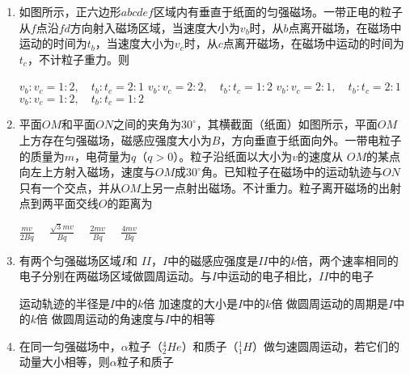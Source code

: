 \begin{enumerate}[leftmargin=0em]
\item
{}
如图所示，正六边形$ abcdef $区域内有垂直于纸面的匀强磁场。一带正电的粒子从$ f $点沿$ fd $方向射入磁场区域，当速度大小为$ v_b $时，从$ b $点离开磁场，在磁场中运动的时间为$ t_b $，当速度大小为$ v_c $时，从$ c $点离开磁场，在磁场中运动的时间为$ t_c $，不计粒子重力。则  
\begin{figure}[h!]
\centering

\end{figure}


\fourchoices
{$v _ { b }: v _ { c } = 1: 2 , \quad t _ { b }: t _ { c } = 2: 1$}
{$v _ { b }: v _ { c } = 2: 2 , \quad t _ { b }: t _ { c } = 1: 2$}
{$v _ { b }: v _ { c } = 2: 1 , \quad t _ { b }: t _ { c } = 2: 1$}
{$v _ { b }: v _ { c } = 1: 2 , \quad t _ { b }: t _ { c } = 1: 2$}

\item
{}
平面$ OM $和平面$ ON $之间的夹角为$ 30 ^{ \circ } $，其横截面（纸面）如图所示，平面$ OM $上方存在匀强磁场，磁感应强度大小为$ B $，方向垂直于纸面向外。一带电粒子的质量为$ m $，电荷量为$ q $（$ q>0 $）。粒子沿纸面以大小为$ v $的速度从	$ OM $的某点向左上方射入磁场，速度与$ OM $成$ 30 ^{ \circ } $角。已知粒子在磁场中的运动轨迹与$ ON $只有一个交点，并从$ OM $上另一点射出磁场。不计重力。粒子离开磁场的出射点到两平面交线$ O $的距离为  
\begin{figure}[h!]
\centering

\end{figure}

\fourchoices
{$\frac { m v } { 2 B q } \quad$}
{$\frac { \sqrt { 3 } m v } { B q } \quad$}
{$\frac { 2 m v } { B q } \quad$}
{$\frac { 4 m v } { B q }$}





\item
{}
有两个匀强磁场区域$ I $和 $ II $，$ I $中的磁感应强度是$ II $中的$ k $倍，两个速率相同的电子分别在两磁场区域做圆周运动。与$ I $中运动的电子相比，$ II $中的电子  


\fourchoices
{运动轨迹的半径是$ I $中的$ k $倍}
{加速度的大小是$ I $中的$ k $倍}
{做圆周运动的周期是$ I $中的$ k $倍}
{做圆周运动的角速度与$ I $中的相等}




\item
{}
在同一匀强磁场中，$ \alpha $粒子（$ ^{4}_{2} He $）和质子（$ ^{1}_{1}H $）做匀速圆周运动，若它们的动量大小相等，则$ \alpha $粒子和质子  



\end{enumerate}
